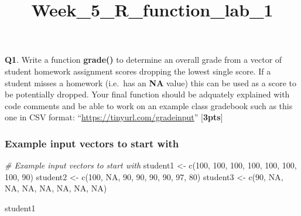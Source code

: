 \documentclass[
]{article}
\title{Week\_5\_R\_function\_lab\_1}
\author{}
\date{\vspace{-2.5em}}
\newenvironment{Shaded}{\begin{snugshade}}{\end{snugshade}}
\newcommand{\CommentTok}[1]{\textcolor[rgb]{0.56,0.35,0.01}{\textit{#1}}}
\newcommand{\ConstantTok}[1]{\textcolor[rgb]{0.00,0.00,0.00}{#1}}
\newcommand{\DecValTok}[1]{\textcolor[rgb]{0.00,0.00,0.81}{#1}}
\newcommand{\FunctionTok}[1]{\textcolor[rgb]{0.00,0.00,0.00}{#1}}
\newcommand{\NormalTok}[1]{#1}
\newcommand{\OtherTok}[1]{\textcolor[rgb]{0.56,0.35,0.01}{#1}}
\begin{document}
\maketitle

\textbf{Q1}. Write a function \textbf{grade()} to determine an overall
grade from a vector of student homework assignment scores dropping the
lowest single score. If a student misses a homework (i.e.~has an
\textbf{NA} value) this can be used as a score to be potentially
dropped. Your final function should be adquately explained with code
comments and be able to work on an example class gradebook such as this
one in CSV format: ``\url{https://tinyurl.com/gradeinput}''
{[}\textbf{3pts}{]}

\hypertarget{example-input-vectors-to-start-with}{%
\subsubsection{Example input vectors to start
with}\label{example-input-vectors-to-start-with}}

\begin{Shaded}
\begin{Highlighting}[]
\CommentTok{\# Example input vectors to start with}
\NormalTok{student1 }\OtherTok{\textless{}{-}} \FunctionTok{c}\NormalTok{(}\DecValTok{100}\NormalTok{, }\DecValTok{100}\NormalTok{, }\DecValTok{100}\NormalTok{, }\DecValTok{100}\NormalTok{, }\DecValTok{100}\NormalTok{, }\DecValTok{100}\NormalTok{, }\DecValTok{100}\NormalTok{, }\DecValTok{90}\NormalTok{)}
\NormalTok{student2 }\OtherTok{\textless{}{-}} \FunctionTok{c}\NormalTok{(}\DecValTok{100}\NormalTok{, }\ConstantTok{NA}\NormalTok{, }\DecValTok{90}\NormalTok{, }\DecValTok{90}\NormalTok{, }\DecValTok{90}\NormalTok{, }\DecValTok{90}\NormalTok{, }\DecValTok{97}\NormalTok{, }\DecValTok{80}\NormalTok{)}
\NormalTok{student3 }\OtherTok{\textless{}{-}} \FunctionTok{c}\NormalTok{(}\DecValTok{90}\NormalTok{, }\ConstantTok{NA}\NormalTok{, }\ConstantTok{NA}\NormalTok{, }\ConstantTok{NA}\NormalTok{, }\ConstantTok{NA}\NormalTok{, }\ConstantTok{NA}\NormalTok{, }\ConstantTok{NA}\NormalTok{, }\ConstantTok{NA}\NormalTok{)}
\end{Highlighting}
\end{Shaded}

\begin{Shaded}
\begin{Highlighting}[]
\NormalTok{student1}
\end{Highlighting}
\end{Shaded}
\end{document}
